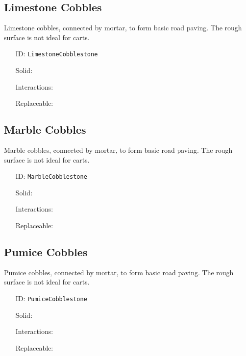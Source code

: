 \subsection{Limestone Cobbles}\label{subsec:blocks_limestone cobbles}
Limestone cobbles, connected by mortar, to form basic road paving.
                The rough surface is not ideal for carts.
\newline
\begin{itemize}[nosep]
\item[ID:] \texttt{LimestoneCobblestone}
\item[Solid:]  \Checkmark \item[Interactions:]  \XSolidBrush \item[Replaceable:]  \XSolidBrush \end{itemize}

\subsection{Marble Cobbles}\label{subsec:blocks_marble cobbles}
Marble cobbles, connected by mortar, to form basic road paving.
                The rough surface is not ideal for carts.
\newline
\begin{itemize}[nosep]
\item[ID:] \texttt{MarbleCobblestone}
\item[Solid:]  \Checkmark \item[Interactions:]  \XSolidBrush \item[Replaceable:]  \XSolidBrush \end{itemize}

\subsection{Pumice Cobbles}\label{subsec:blocks_pumice cobbles}
Pumice cobbles, connected by mortar, to form basic road paving.
                The rough surface is not ideal for carts.
\newline
\begin{itemize}[nosep]
\item[ID:] \texttt{PumiceCobblestone}
\item[Solid:]  \Checkmark \item[Interactions:]  \XSolidBrush \item[Replaceable:]  \XSolidBrush \end{itemize}

